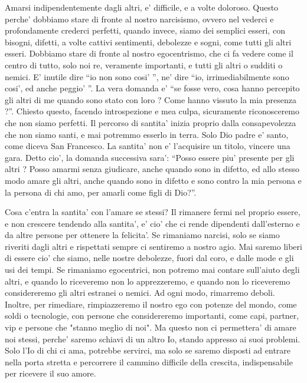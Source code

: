Amarsi indipendentemente dagli altri, e' difficile, e a volte doloroso. Questo perche' dobbiamo stare di fronte al nostro narcisismo, ovvero nel vederci e profondamente crederci perfetti, quando invece, siamo dei semplici esseri, con bisogni, difetti, a volte cattivi sentimenti, debolezze e sogni, come tutti gli altri esseri. Dobbiamo stare di fronte al nostro egocentrismo, che ci fa vedere come il centro di tutto, solo noi re, veramente importanti, e tutti gli altri o sudditi o nemici. E' inutile dire ``io non sono cosi' '', ne' dire ``io, irrimediabilmente sono cosi', ed anche peggio' ''. La vera domanda e' ``se fosse vero, cosa hanno percepito gli altri di me quando sono stato con loro ? Come hanno vissuto la mia presenza ?''. Chiesto questo, facendo introspezione e mea culpa, sicuramente riconosceremo che non siamo perfetti. Il percorso di santita' inizia proprio dalla consapevolezza che non siamo santi, e mai potremmo esserlo in terra. Solo Dio padre e' santo, come diceva San Francesco. La santita' non e' l'acquisire un titolo, vincere una gara. Detto cio', la domanda successiva sara': ``Posso essere piu' presente per gli altri ? Posso amarmi senza giudicare, anche quando sono in difetto, ed allo stesso modo amare gli altri, anche quando sono in difetto e sono contro la mia persona e la persona di chi amo, per amarli come figli di Dio?''.

Cosa c'entra la santita' con l'amare se stessi? Il rimanere fermi nel proprio essere, e non crescere tendendo alla santita', e' cio' che ci rende dipendenti dall'esterno e da altre persone per ottenere la felicita'. Se rimaniamo narcisi, solo se siamo riveriti dagli altri e rispettati sempre ci sentiremo a nostro agio. Mai saremo liberi di essere cio' che siamo, nelle nostre debolezze, fuori dal coro, e dalle mode e gli usi dei tempi. Se rimaniamo egocentrici, non potremo mai contare sull'aiuto degli altri, e quando lo riceveremo non lo apprezzeremo, e quando non lo riceveremo considereremo gli altri estranei o nemici. Ad ogni modo, rimarremo deboli. Inoltre, per rimediare, rimpiazzeremo il nostro ego con potenze del mondo, come soldi o tecnologie, con persone che considereremo importanti, come capi, partner, vip e persone che "stanno meglio di noi". Ma questo non ci permettera' di amare noi stessi, perche' saremo schiavi di un altro Io, stando appresso ai suoi problemi. Solo l'Io di chi ci ama, potrebbe servirci, ma solo se saremo disposti ad entrare nella porta stretta e percorrere il cammino difficile della crescita, indispensabile per ricevere il suo amore.

